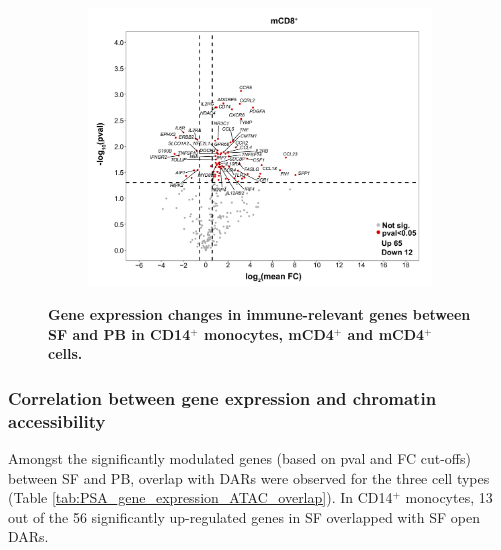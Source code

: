 \begin{figure}[htbp]
\begin{subfigure}{0.6\textwidth}
\caption{\textbf{}}
\end{subfigure} %
\begin{subfigure}{0.6\textwidth}
\centering
\includegraphics[width=\textwidth]{./Results3/pdfs/PSA_CD8_vulcano_plot_PCR_array_mean_FC}
\caption{\textbf{}}
\end{subfigure}
\caption[Gene expression changes in immune-relevant genes between SF and PB in CD14$^+$ monocytes, mCD4$^+$ and mCD4$^+$ cells.]{\textbf{Gene expression changes in immune-relevant genes between SF and PB in CD14$^+$ monocytes, mCD4$^+$ and mCD4$^+$ cells.}}
\label{figure:PSA_PCR_array_vulcano_plots}
\end{figure} 


\subsubsection{Correlation between gene expression and chromatin accessibility}
Amongst the significantly modulated genes (based on pval and FC cut-offs) between SF and PB, overlap with DARs were observed for the three cell types (Table \ref{tab:PSA_gene_expression_ATAC_overlap}). In CD14$^+$ monocytes, 13 out of the 56 significantly up-regulated genes in SF overlapped with SF open DARs. 


